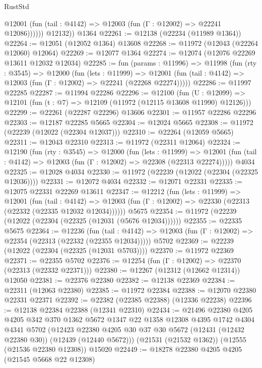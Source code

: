 \begin{lexlean}{RustStd}
\begin{coremodule}
              @12001 (fun (tail : @4142) => @12003 (fun (Γ : @12002) => @22241 @12086))))))
        @12132))
    @1364
@22261 := @12138 (@22234 (@11989 @1364))
@22264 := @12051 (@12052 @1364) @13608
@22268 := @11972 (@12043 (@22264 @12060) @12064)
@22269 := @12077 @1364
@22274 := @12074 (@12076 @22269 @13611 @12032 @12034)
@22285 := fun (params : @11996) =>
  @11998
    (fun (rty : @3545) =>
    @12000
      (fun (lets : @11999) =>
      @12001 (fun (tail : @4142) => @12003 (fun (Γ : @12002) => @22241 (@22268 @22274)))))
@22286 := @11997 @22285
@22287 := @11994 @22286
@22296 := @12100
    (fun (U : @12099) => @12101 (fun (t : @7) => @12109 (@11972 (@12115 @13608 @11990) @12126)))
@22299 := @22261 (@22287 @22296) @13606
@22301 := @11957 @22286 @22296
@22303 := @12187 @22285 @5665
@22304 := @12024 @5665
@22308 := @11972 (@22239 (@12022 (@22304 @12037)))
@22310 := @22264 (@12059 @5665)
@22311 := @12043 @22310
@22313 := @11972 (@22311 @12064)
@22324 := @12190
    (fun (rty : @3545) =>
    @12000
      (fun (lets : @11999) =>
      @12001 (fun (tail : @4142) => @12003 (fun (Γ : @12002) => @22308 (@22313 @22274)))))
    @4034
@22325 := @12028 @4034
@22330 := @11972 (@22239 (@12022 (@22304 (@22325 @12036))))
@22331 := @12072 @4034
@22332 := @12071 @22331
@22335 := @12075 @22331 @22269 @13611
@22347 := @12212
    (fun (lets : @11999) =>
    @12001
      (fun (tail : @4142) =>
      @12003 (fun (Γ : @12002) => @22330 (@22313 (@22332 (@22335 @12032 @12034))))))
    @5675
@22354 := @11972 (@22239 (@12022 (@22304 (@22325 (@12031 (@5676 @12034))))))
@22355 := @22335 @5675
@22364 := @12236
    (fun (tail : @4142) => @12003 (fun (Γ : @12002) => @22354 (@22313 (@22332 (@22355 @12034)))))
    @5702
@22369 := @22239 (@12022 (@22304 (@22325 (@12031 @5703))))
@22370 := @11972 @22369
@22371 := @22355 @5702
@22376 := @12254 (fun (Γ : @12002) => @22370 (@22313 (@22332 @22371)))
@22380 := @12267 (@12312 (@12662 @12314)) @12050
@22381 := @22376 @22380
@22382 := @12138 @22369
@22384 := @22311 (@12063 @22380)
@22385 := @11972 @22384
@22388 := @12070 @22380 @22331 @22371
@22392 := @22382 (@22385 @22388) (@12336 @22238)
@22396 := @12138 @22384 @22388 (@12341 @22310)
@22434 := @21496
    @22380
    @4205
    @4205
    @342
    @370
    @1362
    @5672
    @1347
    @22
    @1358
    @12308
    @4395
    @1742
    @4304
    @4341
    @5702
    (@12423 @22380 @4205 @30 @37 @30 @5672 (@12431 (@12432 @22380 @30)) (@12439 (@12440 @5672)))
    (@21531 (@21532 @1362))
    (@12555 (@21536 @22380 @12308))
    @15020
@22449 := @18278
    @22380
    @4205
    @4205
    (@21545 @5668 @22 @12308)

\end{coremodule}
\end{lexlean}
